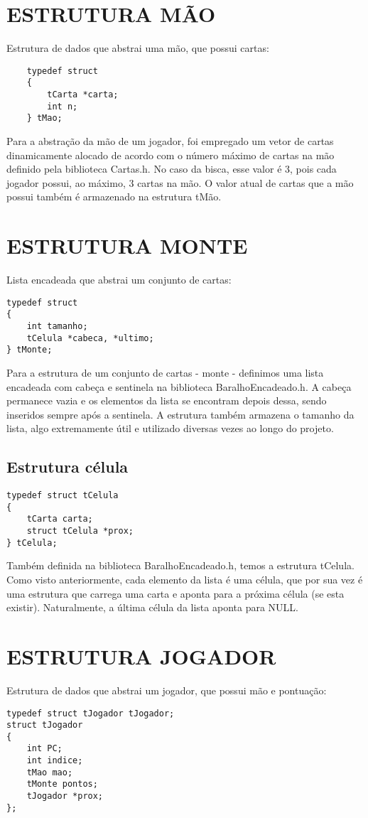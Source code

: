 \documentclass[12pt, oneside, a4paper, brazil]{abntex2}
\begin{document}
\section{ESTRUTURA MÃO}\label{tadMão}
Estrutura de dados que abstrai uma mão, que possui cartas:
\begin{lstlisting}
    typedef struct
    {
        tCarta *carta;
        int n;
    } tMao;
\end{lstlisting}

Para a abstração da mão de um jogador, foi empregado um vetor de cartas dinamicamente alocado de acordo com o número máximo de cartas na mão definido pela biblioteca Cartas.h. No caso da bisca, esse valor é 3, pois cada jogador possui, ao máximo, 3 cartas na mão. O valor atual de cartas que a mão possui também é armazenado na estrutura tMão.

\section{ESTRUTURA MONTE}\label{tadMonte}


Lista encadeada que abstrai um conjunto de cartas:
\begin{lstlisting}
typedef struct
{
    int tamanho;
    tCelula *cabeca, *ultimo;
} tMonte;
\end{lstlisting}

Para a estrutura de um conjunto de cartas - monte - definimos uma lista encadeada com cabeça e sentinela na biblioteca BaralhoEncadeado.h. A cabeça permanece vazia e os elementos da lista se encontram depois dessa, sendo inseridos sempre após a sentinela. A estrutura também armazena o tamanho da lista, algo extremamente útil e utilizado diversas vezes ao longo do projeto.

\subsection{Estrutura célula}
\begin{lstlisting}
typedef struct tCelula
{
    tCarta carta;
    struct tCelula *prox;
} tCelula;
\end{lstlisting}
Também definida na biblioteca BaralhoEncadeado.h, temos a estrutura tCelula. Como visto anteriormente, cada elemento da lista é uma célula, que por sua vez é uma estrutura que carrega uma carta e aponta para a próxima célula (se esta existir). Naturalmente, a última célula da lista aponta para NULL.

\section{ESTRUTURA JOGADOR}
Estrutura de dados que abstrai um jogador, que possui mão e pontuação:
\begin{lstlisting}
typedef struct tJogador tJogador;
struct tJogador
{
    int PC;
    int indice;
    tMao mao;
    tMonte pontos;
    tJogador *prox;
};
\end{lstlisting}
\end{document}
